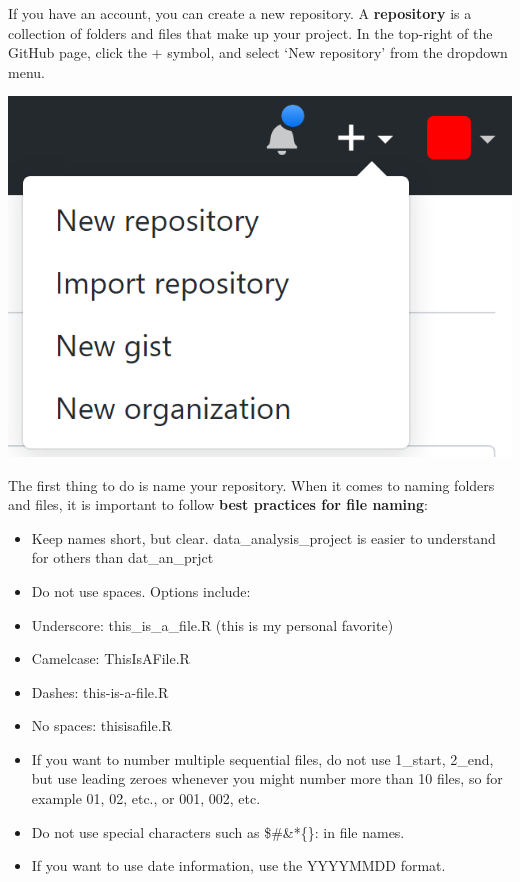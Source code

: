 \documentclass[
  oneside]{krantz}
\begin{document}
If you have an account, you can create a new repository. A \textbf{repository} is a
collection of folders and files that make up your project. In the top-right of
the GitHub page, click the + symbol, and select `New repository' from the
dropdown menu.

\begin{center}\includegraphics[width=1\linewidth]{images/7a1725550cadb293b13fe058631a24ba} \end{center}

The first thing to do is name your repository. When it comes to naming folders
and files, it is important to follow \textbf{best practices for file naming}:

\begin{itemize}
\item
  Keep names short, but clear. data\_analysis\_project is easier to understand
  for others than dat\_an\_prjct
\item
  Do not use spaces. Options include:
\item
  Underscore: this\_is\_a\_file.R (this is my personal favorite)
\item
  Camelcase: ThisIsAFile.R
\item
  Dashes: this-is-a-file.R
\item
  No spaces: thisisafile.R
\item
  If you want to number multiple sequential files, do not use 1\_start, 2\_end,
  but use leading zeroes whenever you might number more than 10 files, so for
  example 01, 02, etc., or 001, 002, etc.
\item
  Do not use special characters such as \$\#\&*\{\}: in file names.
\item
  If you want to use date information, use the YYYYMMDD format.
\end{itemize}
\end{document}
